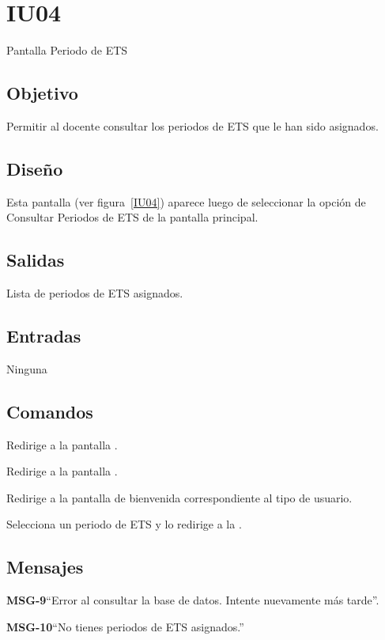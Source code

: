 \section{IU04}{Pantalla Periodo de ETS}

\subsection{Objetivo}
	Permitir al docente consultar los periodos de ETS que le han sido asignados. 

\subsection{Diseño}
	Esta pantalla  (ver figura~\ref{IU04}) aparece luego de seleccionar la opción de Consultar Periodos de ETS de la pantalla principal. 


\subsection{Salidas}

	Lista de periodos de ETS asignados. 

\subsection{Entradas}
Ninguna

\subsection{Comandos}

\begin{Citemize}
	\item {} Redirige a la pantalla .
	\item {} Redirige a la pantalla .
	\item {} Redirige a la pantalla de bienvenida correspondiente al tipo de usuario.
	\item {} Selecciona un periodo de ETS y lo redirige a la . 
\end{Citemize}


\subsection{Mensajes}

\begin{Citemize}
	\item {\bf MSG-9}{``Error al consultar la base de datos. Intente nuevamente más tarde''.}
	\item {\bf MSG-10}{``No tienes periodos de ETS asignados.''}
\end{Citemize}

